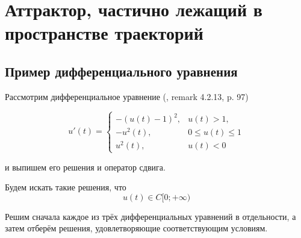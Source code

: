\chapter{Аттрактор, частично лежащий в пространстве траекторий}

\section{Пример дифференциального уравнения}

Рассмотрим дифференциальное уравнение (\cite{Vorotnikov}, remark 4.2.13, p. 97)

\begin{equation}\label{primer_iz_statyi}
	u'(t)=
	\left\{
		\begin{array}{ll}
			-(u(t)-1)^2, & u(t) > 1, \\
			-u^2 (t)   , & 0 \leq u(t) \leq 1 \\
			u^2 (t)    , & u(t) < 0
		\end{array}
	\right.
\end{equation}

и выпишем его решения и оператор сдвига.

Будем искать такие решения, что
\begin{equation}
	u(t) \in C[0; +\infty)
\end{equation}

Решим сначала каждое из трёх дифференциальных уравнений в отдельности, а затем отберём решения,
удовлетворяющие соответствующим условиям.

